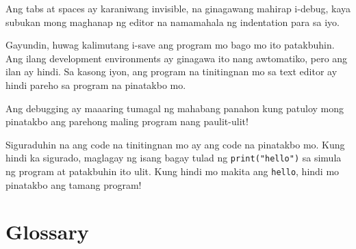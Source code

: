 \documentclass[10pt,]{book}
\begin{document}

Ang tabs at spaces ay karaniwang invisible, na ginagawang mahirap
i-debug, kaya subukan mong maghanap ng editor na namamahala ng
indentation para sa iyo.

Gayundin, huwag kalimutang i-save ang program mo bago mo ito patakbuhin.
Ang ilang development environments ay ginagawa ito nang awtomatiko, pero
ang ilan ay hindi. Sa kasong iyon, ang program na tinitingnan mo sa text
editor ay hindi pareho sa program na pinatakbo mo.

Ang debugging ay maaaring tumagal ng mahabang panahon kung patuloy mong
pinatakbo ang parehong maling program nang paulit-ulit!

Siguraduhin na ang code na tinitingnan mo ay ang code na pinatakbo mo.
Kung hindi ka sigurado, maglagay ng isang bagay tulad ng
\texttt{print("hello")} sa simula ng program at patakbuhin ito ulit.
Kung hindi mo makita ang \texttt{hello}, hindi mo pinatakbo ang tamang
program!

\section{Glossary}\label{glossary-3}
\end{document}
